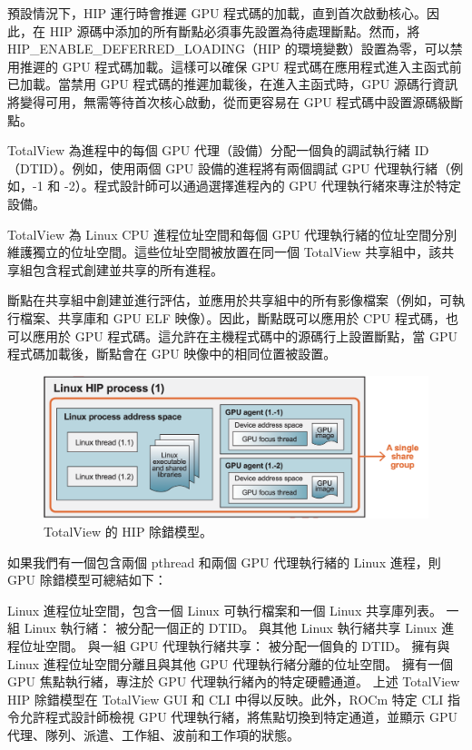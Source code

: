 預設情況下，HIP 運行時會推遲 GPU 程式碼的加載，直到首次啟動核心。因此，在 HIP 源碼中添加的所有斷點必須事先設置為待處理斷點。然而，將 HIP\_ENABLE\_DEFERRED\_LOADING（HIP 的環境變數）設置為零，可以禁用推遲的 GPU 程式碼加載。這樣可以確保 GPU 程式碼在應用程式進入主函式前已加載。當禁用 GPU 程式碼的推遲加載後，在進入主函式時，GPU 源碼行資訊將變得可用，無需等待首次核心啟動，從而更容易在 GPU 程式碼中設置源碼級斷點。

TotalView 為進程中的每個 GPU 代理（設備）分配一個負的調試執行緒 ID（DTID）。例如，使用兩個 GPU 設備的進程將有兩個調試 GPU 代理執行緒（例如，-1 和 -2）。程式設計師可以通過選擇進程內的 GPU 代理執行緒來專注於特定設備。

TotalView 為 Linux CPU 進程位址空間和每個 GPU 代理執行緒的位址空間分別維護獨立的位址空間。這些位址空間被放置在同一個 TotalView 共享組中，該共享組包含程式創建並共享的所有進程。

斷點在共享組中創建並進行評估，並應用於共享組中的所有影像檔案（例如，可執行檔案、共享庫和 GPU ELF 映像）。因此，斷點既可以應用於 CPU 程式碼，也可以應用於 GPU 程式碼。這允許在主機程式碼中的源碼行上設置斷點，當 GPU 程式碼加載後，斷點會在 GPU 映像中的相同位置被設置。

\begin{figure}
    \centering
    \includegraphics[width=0.9\linewidth]{FileAusiliari/Screenshots/Figure13-24.png}
    \caption{TotalView 的 HIP 除錯模型。}
    \label{fig:PAPI24}
\end{figure}


如果我們有一個包含兩個 pthread 和兩個 GPU 代理執行緒的 Linux 進程，則 GPU 除錯模型可總結如下：

Linux 進程位址空間，包含一個 Linux 可執行檔案和一個 Linux 共享庫列表。
一組 Linux 執行緒：
被分配一個正的 DTID。
與其他 Linux 執行緒共享 Linux 進程位址空間。
與一組 GPU 代理執行緒共享：
被分配一個負的 DTID。
擁有與 Linux 進程位址空間分離且與其他 GPU 代理執行緒分離的位址空間。
擁有一個 GPU 焦點執行緒，專注於 GPU 代理執行緒內的特定硬體通道。
上述 TotalView HIP 除錯模型在 TotalView GUI 和 CLI 中得以反映。此外，ROCm 特定 CLI 指令允許程式設計師檢視 GPU 代理執行緒，將焦點切換到特定通道，並顯示 GPU 代理、隊列、派遣、工作組、波前和工作項的狀態。


